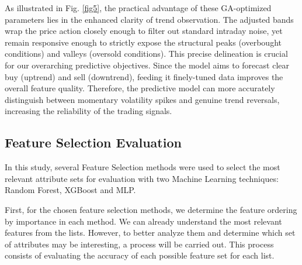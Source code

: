\documentclass{ieeeaccess}
\begin{document}
As illustrated in Fig. \ref{fig5}, the practical advantage of these GA-optimized parameters lies in the enhanced clarity of trend observation. The adjusted bands wrap the price action closely enough to filter out standard intraday noise, yet remain responsive enough to strictly expose the structural peaks (overbought conditions) and valleys (oversold conditions). This precise delineation is crucial for our overarching predictive objectives. Since the model aims to forecast clear buy (uptrend) and sell (downtrend), feeding it finely-tuned data improves the overall feature quality. Therefore, the predictive model can more accurately distinguish between momentary volatility spikes and genuine trend reversals, increasing the reliability of the trading signals.

\subsection{Feature Selection Evaluation}

In this study, several Feature Selection methods were used to select the most relevant attribute sets for evaluation with two Machine Learning techniques: Random Forest, XGBoost and MLP.


First, for the chosen feature selection methods, we determine the feature ordering by importance in each method. We can already understand the most relevant features from the lists. However, to better analyze them and determine which set of attributes may be interesting, a process will be carried out. This process consists of evaluating the accuracy of each possible feature set for each list. %
\end{document}
